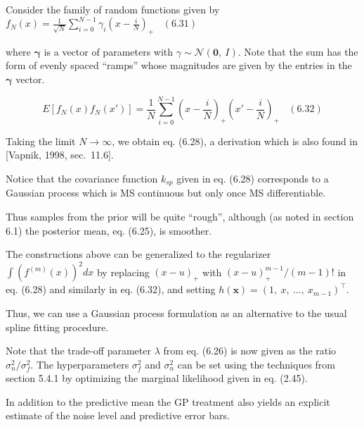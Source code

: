 \documentclass[
  ignorenonframetext,
]{beamer}
\begin{document}
\begin{frame}{}
\protect\hypertarget{section-24}{}
Consider the family of random functions given by
\(f_N(x) = \frac 1 {\sqrt N} \sum^{N−1}_{i=0} \gamma_i(x − \frac i N)_+ \ \ \ \ (6.31)\)

where \(\pmb \gamma\) is a vector of parameters with
\(\gamma \sim \mathcal N (\pmb 0,\ I)\). Note that the sum has the form
of evenly spaced ``ramps'' whose magnitudes are given by the entries in
the \(\pmb \gamma\) vector.

\[
E[f_N(x)f_N(x')] = \frac 1 N \sum^{N−1}_{i=0}(x − \frac i N)_+
(x' − \frac i N)_+\ \ \ \  (6.32)
\]

Taking the limit \(N \rightarrow \infty\), we obtain eq. (6.28), a
derivation which is also found in {[}Vapnik, 1998, sec.~11.6{]}.

Notice that the covariance function \(k_{sp}\) given in eq. (6.28)
corresponds to a Gaussian process which is MS continuous but only once
MS differentiable.

Thus samples from the prior will be quite ``rough'', although (as noted
in section 6.1) the posterior mean, eq. (6.25), is smoother.

The constructions above can be generalized to the regularizer
\(\int (f^{(m)} (x))^2 dx\) by replacing \((x − u)_+\) with
\((x − u)^{m−1}_+ / (m − 1)!\) in eq. (6.28) and similarly in eq.
(6.32), and setting \(h(\pmb x) = (1,\ x,\ ... ,\ x_{m−1})^{\top}\).

Thus, we can use a Gaussian process formulation as an alternative to the
usual spline fitting procedure.

Note that the trade-off parameter \(\lambda\) from eq. (6.26) is now
given as the ratio \(\sigma_n^2 / \sigma_f^2\). The hyperparameters
\(\sigma_f^2\) and \(\sigma_n^2\) can be set using the techniques from
section 5.4.1 by optimizing the marginal likelihood given in eq. (2.45).

In addition to the predictive mean the GP treatment also yields an
explicit estimate of the noise level and predictive error bars.
\end{frame}
\end{document}
